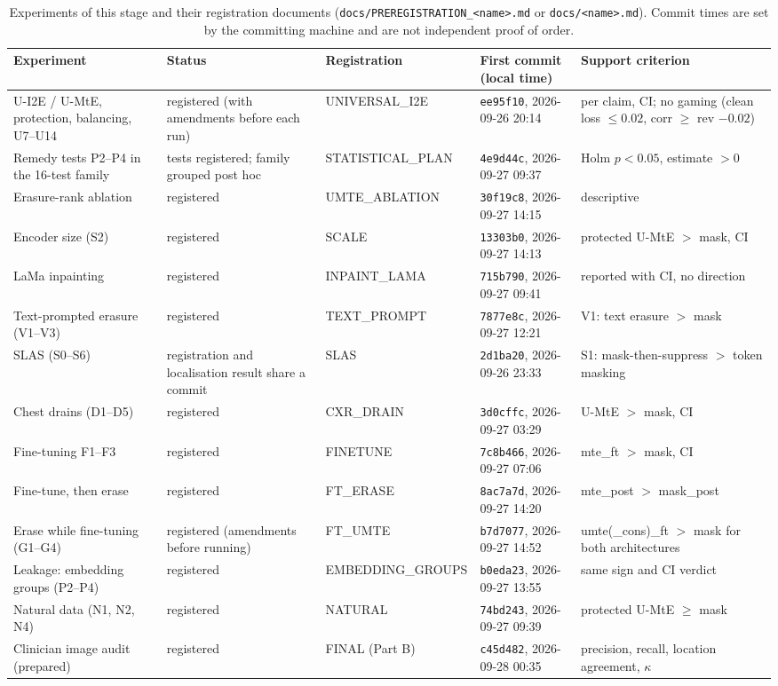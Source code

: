 \begin{table}[H]\centering\scriptsize
\caption{Experiments of this stage and their registration documents (\texttt{docs/PREREGISTRATION\_<name>.md} or \texttt{docs/<name>.md}). Commit times are set by the committing machine and are not independent proof of order.}\label{tab:exp}
\begin{tabular}{p{3.1cm}p{2.1cm}p{2.4cm}p{3.2cm}p{3.3cm}}\toprule
Experiment & Status & Registration & First commit (local time) & Support criterion \\\midrule
U-I2E / U-MtE, protection, balancing, U7--U14 & \ok{} registered (with amendments before each run) & UNIVERSAL\_\allowbreak{}I2E & \texttt{ee95f10}, 2026-09-26 20:14 & per claim, CI; no gaming (clean loss $\le0.02$, corr $\ge$ rev $-0.02$) \\
Remedy tests P2--P4 in the 16-test family & \mixed{} tests registered; family grouped post hoc & STATISTICAL\_\allowbreak{}PLAN & \texttt{4e9d44c}, 2026-09-27 09:37 & Holm $p<0.05$, estimate $>0$ \\
Erasure-rank ablation & \ok{} registered & UMTE\_\allowbreak{}ABLATION & \texttt{30f19c8}, 2026-09-27 14:15 & descriptive \\
Encoder size (S2) & \ok{} registered & SCALE & \texttt{13303b0}, 2026-09-27 14:13 & protected U-MtE $>$ mask, CI \\
LaMa inpainting & \ok{} registered & INPAINT\_\allowbreak{}LAMA & \texttt{715b790}, 2026-09-27 09:41 & reported with CI, no direction \\
Text-prompted erasure (V1--V3) & \ok{} registered & TEXT\_\allowbreak{}PROMPT & \texttt{7877e8c}, 2026-09-27 12:21 & V1: text erasure $>$ mask \\
SLAS (S0--S6) & \mixed{} registration and localisation result share a commit & SLAS & \texttt{2d1ba20}, 2026-09-26 23:33 & S1: mask-then-suppress $>$ token masking \\
Chest drains (D1--D5) & \ok{} registered & CXR\_\allowbreak{}DRAIN & \texttt{3d0cffc}, 2026-09-27 03:29 & U-MtE $>$ mask, CI \\
Fine-tuning F1--F3 & \ok{} registered & FINETUNE & \texttt{7c8b466}, 2026-09-27 07:06 & mte\_ft $>$ mask, CI \\
Fine-tune, then erase & \ok{} registered & FT\_\allowbreak{}ERASE & \texttt{8ac7a7d}, 2026-09-27 14:20 & mte\_post $>$ mask\_post \\
Erase while fine-tuning (G1--G4) & \ok{} registered (amendments before running) & FT\_\allowbreak{}UMTE & \texttt{b7d7077}, 2026-09-27 14:52 & umte(\_cons)\_ft $>$ mask for both architectures \\
Leakage: embedding groups (P2--P4) & \ok{} registered & EMBEDDING\_\allowbreak{}GROUPS & \texttt{b0eda23}, 2026-09-27 13:55 & same sign and CI verdict \\
Natural data (N1, N2, N4) & \ok{} registered & NATURAL & \texttt{74bd243}, 2026-09-27 09:39 & protected U-MtE $\ge$ mask \\
Clinician image audit (prepared) & \ok{} registered & FINAL (Part B) & \texttt{c45d482}, 2026-09-28 00:35 & precision, recall, location agreement, $\kappa$ \\
\bottomrule\end{tabular}
\end{table}
